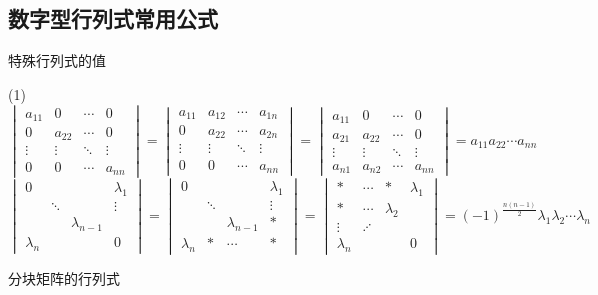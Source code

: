 \documentclass[UTF8]{ctexart}
\theoremstyle{remark}
\begin{document}
	\subsection{数字型行列式常用公式}
	
	特殊行列式的值
	
	(1) 
	\[
	\begin{vmatrix}
		a_{11} & 0 & \cdots & 0 \\
		0 & a_{22} & \cdots & 0 \\
		\vdots & \vdots & \ddots & \vdots \\
		0 & 0 & \cdots & a_{nn}
	\end{vmatrix}
	=
	\begin{vmatrix}
		a_{11} & a_{12} & \cdots & a_{1n} \\
		0 & a_{22} & \cdots & a_{2n} \\
		\vdots & \vdots & \ddots & \vdots \\
		0 & 0 & \cdots & a_{nn}
	\end{vmatrix}
	=
	\begin{vmatrix}
		a_{11} & 0 & \cdots & 0 \\
		a_{21} & a_{22} & \cdots & 0 \\
		\vdots & \vdots & \ddots & \vdots \\
		a_{n1} & a_{n2} & \cdots & a_{nn}
	\end{vmatrix}
	= a_{11}a_{22}\cdots a_{nn}
	\]
	\[
	\begin{vmatrix}
		0 & & & \lambda_1 \\
		& \ddots & & \vdots \\
		& & \lambda_{n - 1} & \\
		\lambda_n & & & 0
	\end{vmatrix}
	=
	\begin{vmatrix}
		0 & & & \lambda_1 \\
		& \ddots & & \vdots \\
		& & \lambda_{n - 1} & * \\
		\lambda_n & * & \cdots & *
	\end{vmatrix}
	=
	\begin{vmatrix}
		* & \cdots & * & \lambda_1 \\
		* & \cdots & \lambda_2 & \\
		\vdots & \iddots & & \\
		\lambda_n & & & 0
	\end{vmatrix}
	= (-1)^{\frac{n(n - 1)}{2}}\lambda_1\lambda_2\cdots\lambda_n
	\]
	
	分块矩阵的行列式
	
\end{document}
